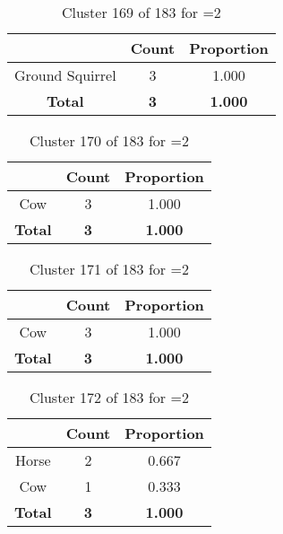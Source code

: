 \begin{table}[ht!]
\centering
\begin{tabular}{|c|c|c|}
\hline
\bf \Spec{} &\bf Count &\bf Proportion\\ \hline \hline
Ground Squirrel & 3 & 1.000\\ \hline
\hline
\bf Total & \bf 3 & \bf 1.000\\ \hline
\end{tabular}
\label{tab:cluster:169:2}
\caption{Cluster 169 of 183 for \minneigh{}=2}
\end{table}

\clearpage
\begin{table}[ht!]
\centering
\begin{tabular}{|c|c|c|}
\hline
\bf \Spec{} &\bf Count &\bf Proportion\\ \hline \hline
Cow & 3 & 1.000\\ \hline
\hline
\bf Total & \bf 3 & \bf 1.000\\ \hline
\end{tabular}
\label{tab:cluster:170:2}
\caption{Cluster 170 of 183 for \minneigh{}=2}
\end{table}

\begin{table}[ht!]
\centering
\begin{tabular}{|c|c|c|}
\hline
\bf \Spec{} &\bf Count &\bf Proportion\\ \hline \hline
Cow & 3 & 1.000\\ \hline
\hline
\bf Total & \bf 3 & \bf 1.000\\ \hline
\end{tabular}
\label{tab:cluster:171:2}
\caption{Cluster 171 of 183 for \minneigh{}=2}
\end{table}

\begin{table}[ht!]
\centering
\begin{tabular}{|c|c|c|}
\hline
\bf \Spec{} &\bf Count &\bf Proportion\\ \hline \hline
Horse & 2 & 0.667\\ \hline
Cow & 1 & 0.333\\ \hline
\hline
\bf Total & \bf 3 & \bf 1.000\\ \hline
\end{tabular}
\label{tab:cluster:172:2}
\caption{Cluster 172 of 183 for \minneigh{}=2}
\end{table}

